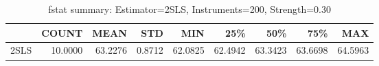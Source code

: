 \begin{table}[ht]
\centering
\caption{fstat summary: Estimator=2SLS, Instruments=200, Strength=0.30}
\begin{tabular}{lrrrrrrrr}
\toprule
 & COUNT & MEAN & STD & MIN & 25\% & 50\% & 75\% & MAX \\
\midrule
2SLS & 10.0000 & 63.2276 & 0.8712 & 62.0825 & 62.4942 & 63.3423 & 63.6698 & 64.5963 \\
\bottomrule
\end{tabular}
\end{table}
